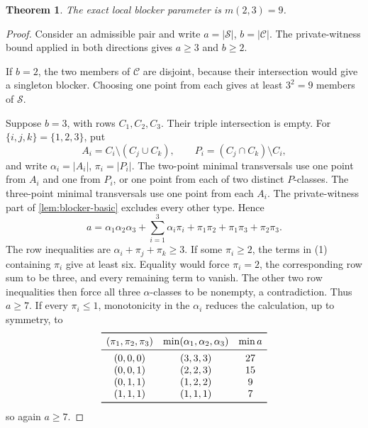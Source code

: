 \documentclass[11pt]{article}
\newtheorem{theorem}{Theorem}[section]
\theoremstyle{definition}
\theoremstyle{remark}
\begin{document}
\begin{theorem}
\label{thm:m23}
The exact local blocker parameter is $m(2,3)=9$.
\end{theorem}

\begin{proof}
Consider an admissible pair and write
$a=|\mathcal S|$, $b=|\mathcal C|$.  The private-witness bound applied in both
directions gives $a\geq3$ and $b\geq2$.

If $b=2$, the two members of $\mathcal C$ are disjoint, because their
intersection would give a singleton blocker.  Choosing one point from each
gives at least $3^2=9$ members of $\mathcal S$.

Suppose $b=3$, with rows $C_1,C_2,C_3$.  Their triple intersection is empty.
For $\{i,j,k\}=\{1,2,3\}$, put
\[
  A_i=C_i\setminus(C_j\cup C_k),\qquad
  P_i=(C_j\cap C_k)\setminus C_i,
\]
and write $\alpha_i=|A_i|$, $\pi_i=|P_i|$.  The two-point minimal
transversals use one point from $A_i$ and one from $P_i$, or one point from
each of two distinct $P$-classes.  The three-point minimal transversals use
one point from each $A_i$.  The private-witness part of
\cref{lem:blocker-basic} excludes every other type.  Hence
\[
  a=\alpha_1\alpha_2\alpha_3+
  \sum_{i=1}^3\alpha_i\pi_i+
  \pi_1\pi_2+\pi_1\pi_3+\pi_2\pi_3.
  \tag{1}
\]
The row inequalities are
$\alpha_i+\pi_j+\pi_k\geq3$.  If some $\pi_i\geq2$, the terms in (1)
containing $\pi_i$ give at least six.  Equality would force
$\pi_i=2$, the corresponding row sum to be three, and every remaining term
to vanish.  The other two row inequalities then force all three
$\alpha$-classes to be nonempty, a contradiction.  Thus $a\geq7$.  If every
$\pi_i\leq1$, monotonicity in the $\alpha_i$ reduces the calculation, up to
symmetry, to
\[
\begin{array}{ccc}
\toprule
(\pi_1,\pi_2,\pi_3)&
\min(\alpha_1,\alpha_2,\alpha_3)&\min a\\
\midrule
(0,0,0)&(3,3,3)&27\\
(0,0,1)&(2,2,3)&15\\
(0,1,1)&(1,2,2)&9\\
(1,1,1)&(1,1,1)&7\\
\bottomrule
\end{array}
\]
so again $a\geq7$.


\end{proof}
\end{document}
